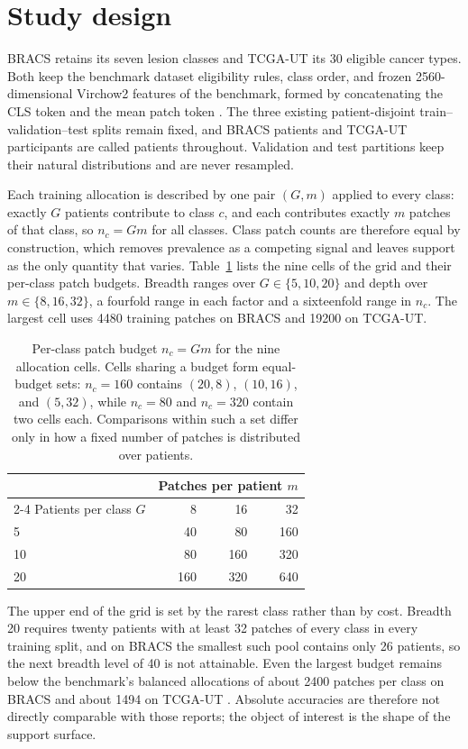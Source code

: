 \documentclass[11pt]{article}
\begin{document}
\section{Study design}
\label{sec:design}
BRACS retains its seven lesion classes and TCGA-UT its 30 eligible cancer types. Both keep the benchmark dataset eligibility rules, class order, and frozen 2560-dimensional Virchow2 features of the benchmark, formed by concatenating the CLS token and the mean patch token \citep{zimmermann2024virchow2,queisler2026benchmarkProtocol}. The three existing patient-disjoint train--validation--test splits remain fixed, and BRACS patients and TCGA-UT participants are called patients throughout. Validation and test partitions keep their natural distributions and are never resampled.

Each training allocation is described by one pair $(G,m)$ applied to every class: exactly $G$ patients contribute to class $c$, and each contributes exactly $m$ patches of that class, so $n_c=Gm$ for all classes. Class patch counts are therefore equal by construction, which removes prevalence as a competing signal and leaves support as the only quantity that varies. Table~\ref{tab:grid} lists the nine cells of the grid and their per-class patch budgets. Breadth ranges over $G\in\{5,10,20\}$ and depth over $m\in\{8,16,32\}$, a fourfold range in each factor and a sixteenfold range in $n_c$. The largest cell uses \num{4480} training patches on BRACS and \num{19200} on TCGA-UT.

\begin{table}[htbp]
\centering
\begin{tabular}{@{}lrrr@{}}
\toprule
& \multicolumn{3}{c}{Patches per patient $m$} \\
\cmidrule(l){2-4}
Patients per class $G$ & 8 & 16 & 32 \\
\midrule
5 & 40 & 80 & 160 \\
10 & 80 & 160 & 320 \\
20 & 160 & 320 & 640 \\
\bottomrule
\end{tabular}
\caption{Per-class patch budget $n_c=Gm$ for the nine allocation cells. Cells sharing a budget form equal-budget sets: $n_c=160$ contains $(20,8)$, $(10,16)$, and $(5,32)$, while $n_c=80$ and $n_c=320$ contain two cells each. Comparisons within such a set differ only in how a fixed number of patches is distributed over patients.}
\label{tab:grid}
\end{table}

\noindent The upper end of the grid is set by the rarest class rather than by cost. Breadth 20 requires twenty patients with at least 32 patches of every class in every training split, and on BRACS the smallest such pool contains only 26 patients, so the next breadth level of 40 is not attainable. Even the largest budget remains below the benchmark's balanced allocations of about \num{2400} patches per class on BRACS and about \num{1494} on TCGA-UT \citep{queisler2026benchmarkResults}. Absolute accuracies are therefore not directly comparable with those reports; the object of interest is the shape of the support surface.
\end{document}
